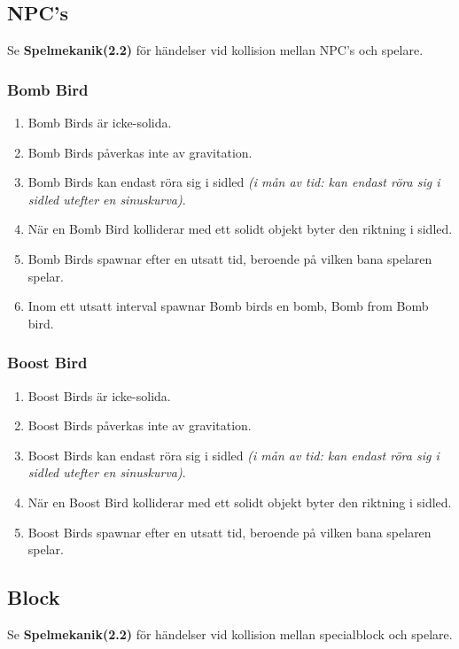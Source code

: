 \documentclass{TDP003mall}
\begin{document}
\newpage

\subsection{NPC's}
Se \textbf{Spelmekanik(2.2)} för händelser vid kollision mellan NPC's och spelare.

\subsubsection{Bomb Bird}
\begin{enumerate}
\item Bomb Birds är icke-solida.
\item Bomb Birds påverkas inte av gravitation.
\item Bomb Birds kan endast röra sig i sidled \textit{(i mån av tid: kan endast röra sig i sidled utefter en sinuskurva)}.
\item När en Bomb Bird kolliderar med ett solidt objekt byter den riktning i sidled.
\item Bomb Birds spawnar efter en utsatt tid, beroende på vilken bana spelaren spelar.
\item Inom ett utsatt interval spawnar Bomb birds en bomb, Bomb from Bomb bird.
\end{enumerate}

\subsubsection{Boost Bird}
\begin{enumerate}
\item Boost Birds är icke-solida.
\item Boost Birds påverkas inte av gravitation.
\item Boost Birds kan endast röra sig i sidled \textit{(i mån av tid: kan endast röra sig i sidled utefter en sinuskurva)}.
\item När en Boost Bird kolliderar med ett solidt objekt byter den riktning i sidled.
\item Boost Birds spawnar efter en utsatt tid, beroende på vilken bana spelaren spelar.
\end{enumerate}

\subsection{Block}
Se \textbf{Spelmekanik(2.2)} för händelser vid kollision mellan specialblock och spelare.
\end{document}
